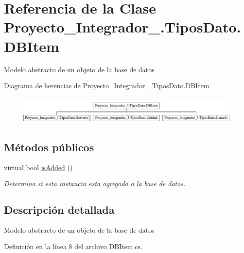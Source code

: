 \hypertarget{class_proyecto___integrador__3_1_1_tipos_dato_1_1_d_b_item}{\section{Referencia de la Clase Proyecto\-\_\-\-Integrador\-\_.\-Tipos\-Dato.\-D\-B\-Item}
\label{class_proyecto___integrador__3_1_1_tipos_dato_1_1_d_b_item}
}


Modelo abstracto de un objeto de la base de datos  


Diagrama de herencias de Proyecto\-\_\-\-Integrador\-\_.\-Tipos\-Dato.\-D\-B\-Item\begin{figure}[H]
\begin{center}
\leavevmode
\includegraphics[height=1.430396cm]{db/d99/class_proyecto___integrador__3_1_1_tipos_dato_1_1_d_b_item}
\end{center}
\end{figure}
\subsection*{Métodos públicos}
\begin{DoxyCompactItemize}
\item 
virtual bool \hyperlink{class_proyecto___integrador__3_1_1_tipos_dato_1_1_d_b_item_ab88d7eef0fa58d7d5fdf40039867dd6e}{is\-Added} ()
\begin{DoxyCompactList}\small\item\em Determina si esta instancia esta agregada a la base de datos. \end{DoxyCompactList}\end{DoxyCompactItemize}


\subsection{Descripción detallada}
Modelo abstracto de un objeto de la base de datos 



Definición en la línea 8 del archivo D\-B\-Item.\-cs.



